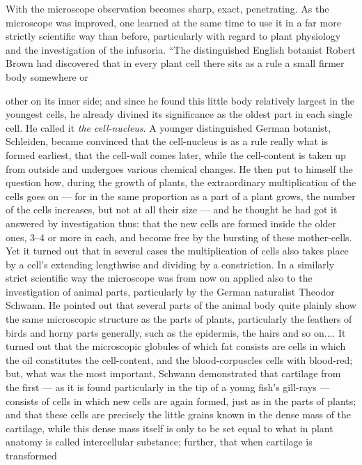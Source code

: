 \documentclass[12pt,a4paper]{book}
\begin{document}
With the microscope observation becomes sharp, exact, penetrating. As the
microscope was improved, one learned at the same time to use it in a far more
strictly scientific way than before, particularly with regard to plant
physiology and the investigation of the infusoria. ``The distinguished English
botanist Robert Brown had discovered that in every plant cell there sits as a
rule a small firmer body somewhere or

other on its inner side; and since he found this little body relatively largest
in the youngest cells, he already divined its significance as the oldest part
in each single cell. He called it \emph{the cell-nucleus}. A younger
distinguished German botanist, Schleiden, became convinced that the
cell-nucleus is as a rule really what is formed earliest, that the cell-wall
comes later, while the cell-content is taken up from outside and undergoes
various chemical changes. He then put to himself the question how, during the
growth of plants, the extraordinary multiplication of the cells goes on --- for
in the same proportion as a part of a plant grows, the number of the cells
increases, but not at all their size --- and he thought he had got it answered
by investigation thus: that the new cells are formed inside the older ones,
3--4 or more in each, and become free by the bursting of these mother-cells.
Yet it turned out that in several cases the multiplication of cells also takes
place by a cell's extending lengthwise and dividing by a constriction. In a
similarly strict scientific way the microscope was from now on applied also to
the investigation of animal parts, particularly by the German naturalist
Theodor Schwann. He pointed out that several parts of the animal body quite
plainly show the same microscopic structure as the parts of plants,
particularly the feathers of birds and horny parts generally, such as the
epidermis, the hairs and so on.... It turned out that the microscopic globules
of which fat consists are cells in which the oil constitutes the cell-content,
and the blood-corpuscles cells with blood-red; but, what was the most
important, Schwann demonstrated that cartilage from the first --- as it is
found particularly in the tip of a young fish's gill-rays --- consists of cells
in which new cells are again formed, just as in the parts of plants; and that
these cells are precisely the little grains known in the dense mass of the
cartilage, while this dense mass itself is only to be set equal to what in
plant anatomy is called intercellular substance; further, that when cartilage
is transformed
\end{document}
